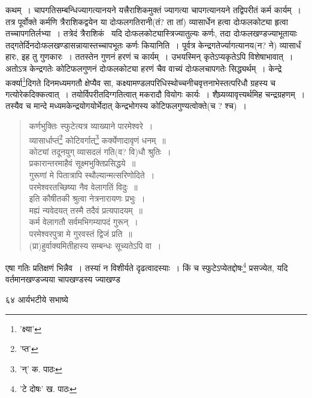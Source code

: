 \documentclass[11pt, openany]{book}
\begin{document}
{{{{\vspace{0.3cm}
\noindent कथम्~। चापगतिसम्बन्धिज्यागत्यानयने यत्त्रैराशिकमुक्तं ज्यागत्या चापगत्यानयने तद्विपरीतं कर्म कार्यम्~। तत्र पूर्वोक्ते कर्मणि त्रैराशिकद्वयेन या दोःफलगतिरानी(तं? ता तां) व्यासार्धेन हत्वा दोःफलकोट्या हृत्वा तच्चापगतिर्लभ्या~। तत्रेदं त्रैराशिकं  \textendash\ यदि दोःफलकोट्यास्त्रिज्यातुल्यः कर्णः, तदा दोःफलखण्डज्याभूतायाः तद्गतेर्दिनदोःफलखण्डासन्नायास्तच्चापभूतः कर्णः कियानिति~। पूर्वत्र केन्द्रगतेर्ज्यागत्यानय(न? ने) व्यासार्धं हारः, इह तु गुणकारः~। ततस्तेन गुणनं हरणं च कार्यम्~। उभयस्मिन् कृतेऽप्यकृतेऽपि विशेषाभावात्~। अतोऽत्र केन्द्रगतेः कोटिफलगुणनं दोःफलकोट्या हरणं चैव वाच्यं दोःफलचापगतेः सिद्ध्यर्थम्~। केन्द्रे कर्क्या\renewcommand{\thefootnote}{१}\footnote{'क्ष्या'}दिगते दिनमध्यमगतौ क्षेप्यैव सा,
कक्ष्यामण्डलपरिधिस्थोच्चनीचवृत्तनाभेस्तत्परिधौ ग्रहस्य च गत्योरेकदिक्कत्वात्~। तयोर्विपरीतदिग्गतित्वात् मकरादौ वियोगः कार्यः~। शैघ्र्यव्यावृत्त्यर्थमिह चन्द्रग्रहणम्~। तस्यैव च मान्दे मध्यमकेन्द्रयोगयोर्भेदात् केन्द्रभोगस्य कोटिफलगुण्यत्वोक्ते(च ? श्च)~। 

\begin{quote}
{\qt कर्णभुक्तिः स्फुटेत्यत्र व्याख्याने पारमेश्वरे~।\\
व्यासार्धाप्तं\renewcommand{\thefootnote}{२}\footnote{'प्त'} कोटिवर्गात्\renewcommand{\thefootnote}{३}\footnote{'न्' क. पाठः} कर्क्येणादावृणं धनम्~॥\\
कोट्यां तदूनयुग् व्यासदलं गति(व? वि)धौ श्रुतिः~।\\
प्रकारान्तरमाहैवं सूक्ष्मभुक्तिप्रसिद्धये~॥\\
गुरूणां मे पितात्रापि स्थौल्यान्मत्सरिणोदिते~।\\
परमेश्वरतच्छिष्या नैव वेलागतिं विदुः~॥\\
इति कौषीतकी श्रुत्वा नेत्रनारायणः प्रभुः~।\\
मह्यं न्यवेदयत् तस्मै तदैवं प्रत्यपादयम्~॥\\
कर्म वेलागतौ सर्वमभिगम्यापदं गुरून्~।\\
परमेश्वरपुत्रा मे गुरवस्तं द्विजं प्रति~॥\\
(प्रा)हुर्वाक्यमितीहास्य सम्बन्धः सूच्यतेऽपि वा~।}
\end{quote}

\noindent एषा गतिः प्रतिक्षणं भिन्नैव~। तस्यां न विशीर्यते दृढत्वादस्याः~। किं च स्फुटेऽप्येतद्दोषः\renewcommand{\thefootnote}{४}\footnote{'टे दोषः' ख. पाठः} प्रसज्येत, यदि वर्तमानखण्डज्यया चापखण्डस्य ज्याखण्ड

\newpage

\vspace{3cm} ६४ \hspace{4cm}आर्यभटीये सभाष्ये 

}}}}
\end{document}
